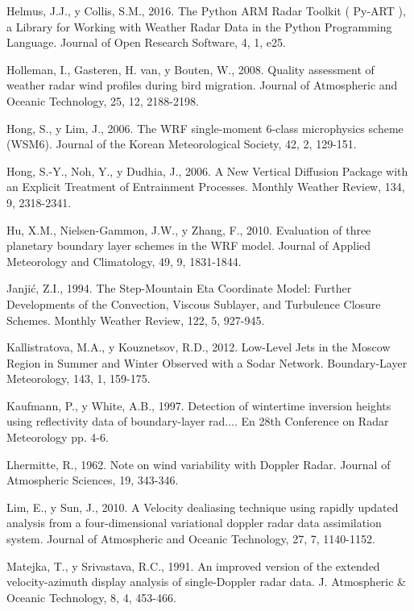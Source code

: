 \documentclass[12pt,spanish,oneside]{book}
\begin{document}
\hypertarget{ref-Helmus2016}{}
Helmus, J.J., y Collis, S.M., 2016. The Python ARM Radar Toolkit (
Py-ART ), a Library for Working with Weather Radar Data in the Python
Programming Language. Journal of Open Research Software, 4, 1, e25.

\hypertarget{ref-Holleman2008}{}
Holleman, I., Gasteren, H. van, y Bouten, W., 2008. Quality assessment
of weather radar wind profiles during bird migration. Journal of
Atmospheric and Oceanic Technology, 25, 12, 2188-2198.

\hypertarget{ref-Hong2006a}{}
Hong, S., y Lim, J., 2006. The WRF single-moment 6-class microphysics
scheme (WSM6). Journal of the Korean Meteorological Society, 42, 2,
129-151.

\hypertarget{ref-Hong2006}{}
Hong, S.-Y., Noh, Y., y Dudhia, J., 2006. A New Vertical Diffusion
Package with an Explicit Treatment of Entrainment Processes. Monthly
Weather Review, 134, 9, 2318-2341.

\hypertarget{ref-Hu2010}{}
Hu, X.M., Nielsen-Gammon, J.W., y Zhang, F., 2010. Evaluation of three
planetary boundary layer schemes in the WRF model. Journal of Applied
Meteorology and Climatology, 49, 9, 1831-1844.

\hypertarget{ref-Janjic1994}{}
Janjić, Z.I., 1994. The Step-Mountain Eta Coordinate Model: Further
Developments of the Convection, Viscous Sublayer, and Turbulence Closure
Schemes. Monthly Weather Review, 122, 5, 927-945.

\hypertarget{ref-Kallistratova2012}{}
Kallistratova, M.A., y Kouznetsov, R.D., 2012. Low-Level Jets in the
Moscow Region in Summer and Winter Observed with a Sodar Network.
Boundary-Layer Meteorology, 143, 1, 159-175.

\hypertarget{ref-Kaufmann1997}{}
Kaufmann, P., y White, A.B., 1997. Detection of wintertime inversion
heights using reflectivity data of boundary-layer rad.... En 28th
Conference on Radar Meteorology pp. 4-6.

\hypertarget{ref-Lhermitte1962}{}
Lhermitte, R., 1962. Note on wind variability with Doppler Radar.
Journal of Atmospheric Sciences, 19, 343-346.

\hypertarget{ref-Lim2010}{}
Lim, E., y Sun, J., 2010. A Velocity dealiasing technique using rapidly
updated analysis from a four-dimensional variational doppler radar data
assimilation system. Journal of Atmospheric and Oceanic Technology, 27,
7, 1140-1152.

\hypertarget{ref-Matejka1991}{}
Matejka, T., y Srivastava, R.C., 1991. An improved version of the
extended velocity-azimuth display analysis of single-Doppler radar data.
J. Atmospheric \& Oceanic Technology, 8, 4, 453-466.
\end{document}
